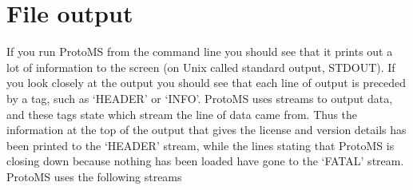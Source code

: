 \documentclass[letterpaper,10pt,english]{sphinxmanual}
\begin{document}
\ignorespaces 

\section{File output}
\label{\detokenize{protoms:file-output}}\label{\detokenize{protoms:index-27}}
If you run ProtoMS from the command line you should see that it prints out a lot of information to the screen (on Unix called standard output, STDOUT). If you look closely at the output you should see that each line of output is preceded by a tag, such as ‘HEADER’ or ‘INFO’. ProtoMS uses streams to output data, and these tags state which stream the line of data came from. Thus the information at the top of the output that gives the license and version details has been printed to the ‘HEADER’ stream, while the lines stating that ProtoMS is closing down because nothing has been loaded have gone to the ‘FATAL’ stream. ProtoMS uses the following streams
\end{document}
